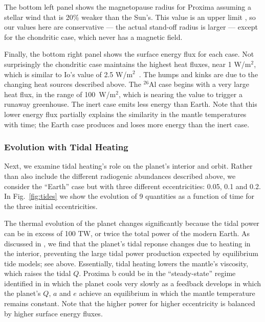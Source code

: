 \documentclass[preprint,12pt]{aastex}
\begin{document}
The bottom left panel shows the magnetopause radius for Proxima
assuming a stellar wind that is 20\% weaker than the Sun's. This value
is an upper limit \citep{Wood01}, so our values here are conservative
--- the actual stand-off radius is larger --- except for the
chondritic case, which never has a magnetic field.

Finally, the bottom right panel shows the surface energy flux for each
case. Not surprisingly the chondritic case maintains the highest heat
fluxes, near 1 W/m$^2$, which is similar to Io's value of 2.5
W/m$^2$~\citep{Veeder94}. The humps and kinks are due to the changing
heat sources described above. The $^{26}$Al case begins with a very
large heat flux, in the range of 100~W/m$^2$, which is nearing the
value to trigger a runaway greenhouse. The inert case emits less
energy than Earth. Note that this lower energy flux partially explains
the similarity in the mantle temperatures with time; the Earth case
produces and loses more energy than the inert case.

\subsubsection{Evolution with Tidal Heating}
\label{sec:results:internal:tides}

Next, we examine tidal heating's role on the planet's interior
and orbit. Rather than also include the different radiogenic
abundances described above, we consider the ``Earth'' case but with
three different eccentricities: 0.05, 0.1 and 0.2. In
Fig.~\ref{fig:tides} we show the evolution of 9 quantities as a
function of time for the three initial eccentricities.

The thermal evolution of the planet changes significantly
because the tidal power can be in excess of 100 TW, or twice the total
power of the modern Earth. As discussed in \cite{DriscollBarnes15}, we find
that the planet's tidal reponse changes due to heating in the
interior, preventing the large tidal power production expected by
equilibrium tide models; see above. Essentially, tidal heating lowers
the mantle's viscosity, which raises the tidal $Q$. Proxima b could
be in the ``steady-state'' regime identified in
\cite{DriscollBarnes15} in which the planet cools very slowly as a
feedback develops in which the planet's $Q$, $a$ and $e$ achieve an
equilibrium in which the mantle temperature remains constant. Note
that the higher power for higher eccentricity is balanced by higher
surface energy fluxes.
\end{document}
